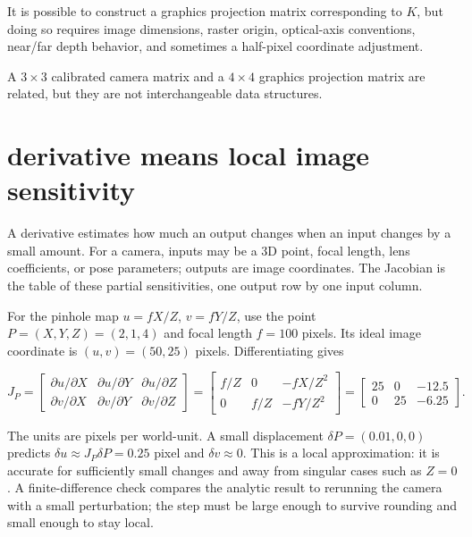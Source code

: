 It is possible to construct a graphics projection matrix corresponding to \(K\), but doing so requires image dimensions, raster origin, optical-axis conventions, near/far depth behavior, and sometimes a half-pixel coordinate adjustment.

A \(3\times3\) calibrated camera matrix and a \(4\times4\) graphics projection matrix are related, but they are not interchangeable data structures.

\section{derivative means local image sensitivity}\label{02-foundations-ii-ch034-derivative-means-local-image-sensitivity}

\hypertarget{02-foundations-ii-ch034-derivative-means-local-image-sensitivity}{}

A derivative estimates how much an output changes when an input changes by a small amount. For a camera, inputs may be a 3D point, focal length, lens coefficients, or pose parameters; outputs are image coordinates. The Jacobian is the table of these partial sensitivities, one output row by one input column.

For the pinhole map \(u=fX/Z\), \(v=fY/Z\), use the point \(P=(X,Y,Z)=(2,1,4)\) and focal length \(f=100\) pixels. Its ideal image coordinate is \((u,v)=(50,25)\) pixels. Differentiating gives

\[
J_P=\begin{bmatrix}
\partial u/\partial X&\partial u/\partial Y&\partial u/\partial Z\\
\partial v/\partial X&\partial v/\partial Y&\partial v/\partial Z
\end{bmatrix}
=\begin{bmatrix}f/Z&0&-fX/Z^2\\0&f/Z&-fY/Z^2\end{bmatrix}
=\begin{bmatrix}25&0&-12.5\\0&25&-6.25\end{bmatrix}.
\]

The units are pixels per world-unit. A small displacement \(\delta P=(0.01,0,0)\) predicts \(\delta u\approx J_P\delta P=0.25\) pixel and \(\delta v\approx0\). This is a local approximation: it is accurate for sufficiently small changes and away from singular cases such as \(Z=0\). A finite-difference check compares the analytic result to rerunning the camera with a small perturbation; the step must be large enough to survive rounding and small enough to stay local.

